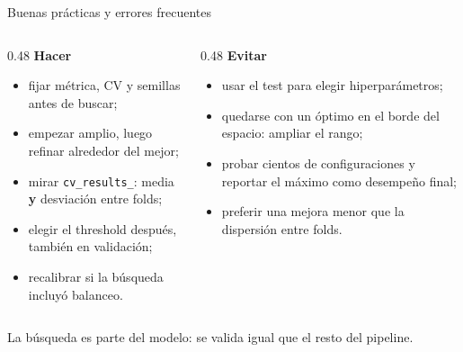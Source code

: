 \documentclass[aspectratio=169,12pt]{beamer}
\newcommand{\colhead}[1]{\textbf{#1}\par\vspace{2pt}}
\begin{document}
\begin{frame}{Buenas prácticas y errores frecuentes}
  \begin{columns}[T]
    \begin{column}{0.48\textwidth}
      \colhead{Hacer}
      \footnotesize
      \begin{itemize}
        \item fijar métrica, CV y semillas antes de buscar;
        \item empezar amplio, luego refinar alrededor del mejor;
        \item mirar \texttt{cv\_results\_}: media \textbf{y} desviación entre folds;
        \item elegir el threshold después, también en validación;
        \item recalibrar si la búsqueda incluyó balanceo.
      \end{itemize}
    \end{column}
    \begin{column}{0.48\textwidth}
      \colhead{Evitar}
      \footnotesize
      \begin{itemize}
        \item usar el test para elegir hiperparámetros;
        \item quedarse con un óptimo en el borde del espacio: ampliar el rango;
        \item probar cientos de configuraciones y reportar el máximo como desempeño final;
        \item preferir una mejora menor que la dispersión entre folds.
      \end{itemize}
    \end{column}
  \end{columns}
  \vspace{4pt}
  \begin{keybox}
    \small La búsqueda es parte del modelo: se valida igual que el resto del pipeline.
  \end{keybox}
\end{frame}
\end{document}
